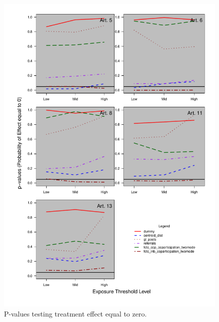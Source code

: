\documentclass[10pt]{article}
\begin{document}
\begin{figure}[H]
	\centering
	\includegraphics[width=.8\linewidth]{../fig/matching_summary.pdf}
	\caption{P-values testing treatment effect equal to zero.}
\end{figure}




\end{document}
